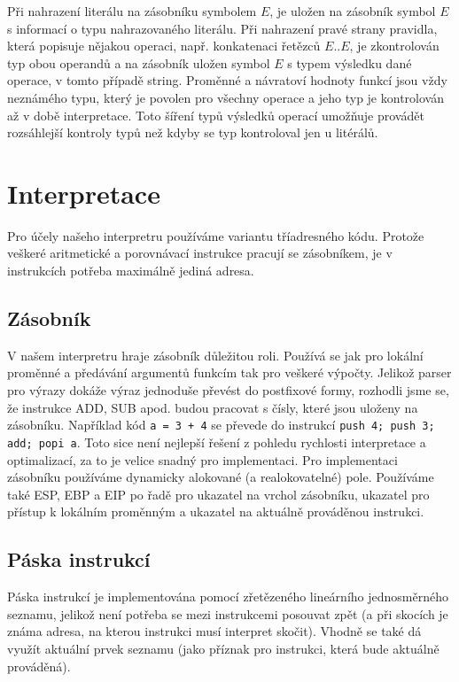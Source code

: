 \documentclass[a4paper,11pt,titlepage]{article}
\begin{document}
Při nahrazení literálu na zásobníku symbolem $E$, je uložen na zásobník symbol $E$ s informací o typu nahrazovaného literálu.
Při nahrazení pravé strany pravidla, která popisuje nějakou operaci, např. konkatenaci řetězců $E .. E$, je zkontrolován typ obou operandů a na zásobník uložen symbol $E$ s typem výsledku dané operace, v tomto případě string. Proměnné a návratoví hodnoty funkcí jsou vždy neznámého typu, který je povolen pro všechny operace a jeho typ je kontrolován až v době interpretace. Toto šíření typů výsledků operací umožňuje provádět rozsáhlejší kontroly typů než kdyby se typ kontroloval jen u litérálů.

\section{Interpretace}

Pro účely našeho interpretru používáme variantu tříadresného kódu. Pro\-to\-že veškeré aritmetické a porovnávací instrukce pracují se zásobníkem, je v instrukcích potřeba maximálně jediná adresa.

\subsection{Zásobník}

V našem interpretru hraje zásobník důležitou roli. Používá se jak pro lokální proměnné a předávání argumentů funkcím tak pro veškeré výpočty. Jelikož parser pro výrazy dokáže výraz jednoduše převést do postfixové formy, rozhodli jsme se, že instrukce ADD, SUB apod. budou pracovat s čísly, které jsou uloženy na zásobníku. Například kód {\tt a = 3 + 4} se převede do instrukcí {\tt push 4; push 3; add; popi a}. Toto sice není nejlepší řešení z pohledu rychlosti interpretace a optimalizací, za to je velice snadný pro implementaci. Pro implementaci zásobníku používáme dynamicky alokované (a realokovatelné) pole. Používáme také  ESP, EBP a EIP po řadě pro ukazatel na vrchol zásobníku, ukazatel pro přístup k lokálním proměnným a ukazatel na aktuálně prováděnou instrukci.

\subsection{Páska instrukcí}

Páska instrukcí je implementována pomocí zřetězeného lineárního jedno\-směr\-né\-ho seznamu, jelikož není potřeba se mezi instrukcemi posouvat zpět (a při skocích je známa adresa, na kterou instrukci musí interpret skočit). Vhodně se také dá využít aktuální prvek seznamu (jako příznak pro instrukci, která bude aktuálně prováděná).
\end{document}
